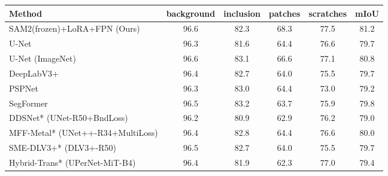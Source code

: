 \begin{tabular}{lccccc}
\toprule
Method & background & inclusion & patches & scratches & mIoU \\
\midrule
SAM2(frozen)+LoRA+FPN (Ours) & 96.6 & 82.3 & 68.3 & 77.5 & 81.2 \\
U-Net & 96.3 & 81.6 & 64.4 & 76.6 & 79.7 \\
U-Net (ImageNet) & 96.6 & 83.1 & 66.6 & 77.1 & 80.8 \\
DeepLabV3+ & 96.4 & 82.7 & 64.0 & 75.5 & 79.7 \\
PSPNet & 96.3 & 83.0 & 64.4 & 73.0 & 79.2 \\
SegFormer & 96.5 & 83.2 & 63.7 & 75.9 & 79.8 \\
DDSNet* (UNet-R50+BndLoss) & 96.2 & 80.9 & 62.9 & 76.2 & 79.0 \\
MFF-Metal* (UNet++-R34+MultiLoss) & 96.4 & 82.8 & 64.4 & 76.6 & 80.0 \\
SME-DLV3+* (DLV3+-R50) & 96.5 & 82.7 & 64.0 & 75.5 & 79.7 \\
Hybrid-Trans* (UPerNet-MiT-B4) & 96.4 & 81.9 & 62.3 & 77.0 & 79.4 \\
\bottomrule
\end{tabular}
